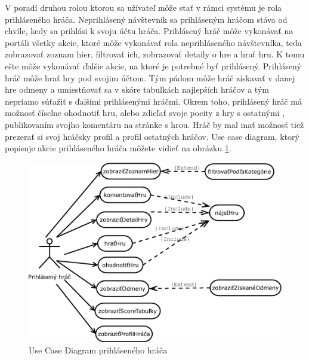 V poradí druhou rolou ktorou sa užívateľ môže stať v rámci systému je rola prihláseného hráča. Neprihlásený návštevník sa prihláseným hráčom stáva od chvíle, kedy sa prihlási k svoju účtu hráča.  Prihlásený hráč môže vykonávať na portáli všetky akcie, ktoré môže vykonávať rola neprihláseného návštevníka, teda zobrazovať zoznam hier, filtrovať ich, zobrazovať detaily o hre a hrať hru. K tomu ešte môže vykonávať ďalšie akcie, na ktoré je potrebné byť prihlásený. Prihlásený hráč môže hrať hry pod svojim účtom. Tým pádom môže hráč získavať v danej hre odmeny a umiestňovať sa v skóre tabuľkách najlepších hráčov a tým nepriamo súťažiť s ďalšími prihlásenými hráčmi. Okrem toho, prihlásený hráč má možnosť číselne ohodnotiť hru, alebo zdieľať svoje pocity z hry s ostatnými , publikovaním svojho komentáru na stránke s hrou. Hráč by mal mať možnosť tiež prezerať si svoj hráčsky profil a profil ostatných hráčov. Use case diagram, ktorý popisuje akcie prihláseného hráča môžete vidieť na obrázku \ref{fig:ucdprihlasenyhrac}.
\pagebreak
\begin{figure}[h]
  \centering
  \includegraphics[scale=0.43]{fig/ucd-prihlasenyhrac.eps}
  \caption{Use Case Diagram prihláseného hráča}
  \label{fig:ucdprihlasenyhrac}
\end{figure}


